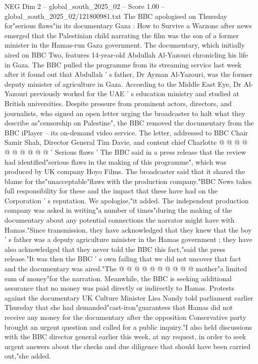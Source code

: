 \begin{textsample}{NEG Dim 2 – global\_south\_2025\_02 – Score 1.00 – global\_south\_2025\_02/121800981.txt}  \label{ex:f2_neg_065}
The BBC apologised on Thursday for"serious flaws"in its documentary Gaza : How to Survive a Warzone after news emerged that the Palestinian child narrating the film was the son of a former minister in the Hamas-run Gaza government.
The documentary, which initially aired on BBC Two, features 14-year-old Abdullah Al-Yazouri chronicling his life in Gaza.
The BBC pulled the programme from its streaming service last week after it found out that Abdullah ' s father, Dr Ayman Al-Yazouri, was the former deputy minister of agriculture in Gaza.
According to the Middle East Eye, Dr Al-Yazouri previously worked for the UAE ' s education ministry and studied at British universities.
Despite pressure from prominent actors, directors, and journalists, who signed an open letter urging the broadcaster to halt what they describe as"censorship on Palestine", the BBC removed the documentary from the BBC iPlayer -- its on-demand video service.
The letter, addressed to BBC Chair Samir Shah, Director General Tim Davie, and content chief Charlotte @ @ @ @ @ @ @ @ @ @ ' Serious flaws ' The BBC said in a press release that the review had identified"serious flaws in the making of this programme", which was produced by UK company Hoyo Films.
The broadcaster said that it shared the blame for the"unacceptable"flaws with the production company."BBC News takes full responsibility for these and the impact that these have had on the Corporation ' s reputation.
We apologise,"it added.
The independent production company was asked in writing"a number of times"during the making of the documentary about any potential connections the narrator might have with Hamas."Since transmission, they have acknowledged that they knew that the boy ' s father was a deputy agriculture minister in the Hamas government ; they have also acknowledged that they never told the BBC this fact,"said the press release."It was then the BBC ' s own failing that we did not uncover that fact and the documentary was aired."The @ @ @ @ @ @ @ @ @ @ mother"a limited sum of money"for the narration.
Meanwhile, the BBC is seeking additional assurance that no money was paid directly or indirectly to Hamas.
Protests against the documentary UK Culture Minister Lisa Nandy told parliament earlier Thursday that she had demanded"cast-iron"guarantees that Hamas did not receive any money for the documentary after the opposition Conservative party brought an urgent question and called for a public inquiry."I also held discussions with the BBC director general earlier this week, at my request, in order to seek urgent answers about the checks and due diligence that should have been carried out,"she added.

\end{textsample}
